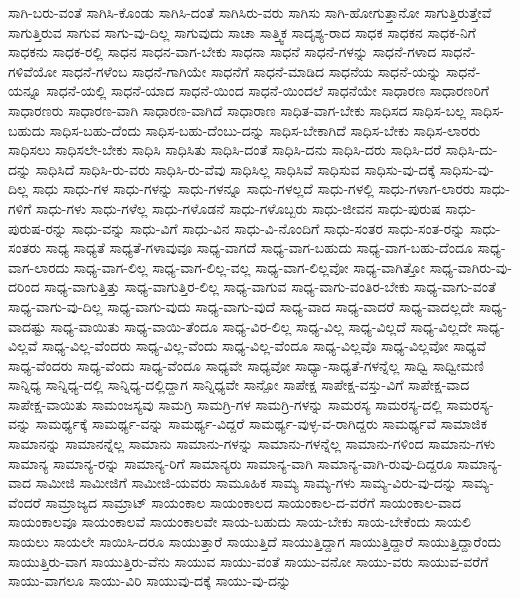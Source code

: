{ಸಾಗಿ-ಬರು-ವಂತೆ
ಸಾಗಿಸಿ-ಕೊಂಡು
ಸಾಗಿಸಿ-ದಂತೆ
ಸಾಗಿಸಿರು-ವರು
ಸಾಗಿಸು
ಸಾಗಿ-ಹೋಗುತ್ತಾನೋ
ಸಾಗುತ್ತಿರುತ್ತೇವೆ
ಸಾಗುತ್ತಿರುವ
ಸಾಗುವ
ಸಾಗು-ವು-ದಿಲ್ಲ
ಸಾಗುವುದು
ಸಾಚಾ
ಸಾತ್ತ್ವಿಕ
ಸಾದೃಶ್ಯ-ರಾದ
ಸಾಧಕ
ಸಾಧಕನ
ಸಾಧಕ-ನಿಗೆ
ಸಾಧಕನು
ಸಾಧಕ-ರಲ್ಲಿ
ಸಾಧನ
ಸಾಧನ-ವಾಗ-ಬೇಕು
ಸಾಧನಾ
ಸಾಧನೆ
ಸಾಧನೆ-ಗಳನ್ನು
ಸಾಧನೆ-ಗಳಾದ
ಸಾಧನೆ-ಗಳಿವೆಯೋ
ಸಾಧನೆ-ಗಳೆಂಬ
ಸಾಧನೆ-ಗಾಗಿಯೇ
ಸಾಧನೆಗೆ
ಸಾಧನೆ-ಮಾಡಿದ
ಸಾಧನೆಯ
ಸಾಧನೆ-ಯನ್ನು
ಸಾಧನೆ-ಯನ್ನೂ
ಸಾಧನೆ-ಯಲ್ಲಿ
ಸಾಧನೆ-ಯಾದ
ಸಾಧನೆ-ಯಿಂದ
ಸಾಧನೆ-ಯಿಂದಲೆ
ಸಾಧನೆಯೇ
ಸಾಧಾರಣ
ಸಾಧಾರಣರಿಗೆ
ಸಾಧಾರಣರು
ಸಾಧಾರಣ-ವಾಗಿ
ಸಾಧಾರಣ-ವಾಗಿದೆ
ಸಾಧಾರಾಣ
ಸಾಧಿತ-ವಾಗ-ಬೇಕು
ಸಾಧಿಸದ
ಸಾಧಿಸ-ಬಲ್ಲ
ಸಾಧಿಸ-ಬಹುದು
ಸಾಧಿಸ-ಬಹು-ದೆಂದು
ಸಾಧಿಸ-ಬಹು-ದೆಂಬು-ದನ್ನು
ಸಾಧಿಸ-ಬೇಕಾಗಿದೆ
ಸಾಧಿಸ-ಬೇಕು
ಸಾಧಿಸ-ಲಾರರು
ಸಾಧಿಸಲು
ಸಾಧಿಸಲೇ-ಬೇಕು
ಸಾಧಿಸಿ
ಸಾಧಿಸಿತು
ಸಾಧಿಸಿ-ದಂತೆ
ಸಾಧಿಸಿ-ದನು
ಸಾಧಿಸಿ-ದರು
ಸಾಧಿಸಿ-ದರೆ
ಸಾಧಿಸಿ-ದು-ದನ್ನು
ಸಾಧಿಸಿದೆ
ಸಾಧಿಸಿ-ರು-ವರು
ಸಾಧಿಸಿ-ರು-ವೆವು
ಸಾಧಿಸಿಲ್ಲ
ಸಾಧಿಸಿವೆ
ಸಾಧಿಸುವ
ಸಾಧಿಸು-ವು-ದಕ್ಕೆ
ಸಾಧಿಸು-ವು-ದಿಲ್ಲ
ಸಾಧು
ಸಾಧು-ಗಳ
ಸಾಧು-ಗಳನ್ನು
ಸಾಧು-ಗಳನ್ನೂ
ಸಾಧು-ಗಳಲ್ಲದೆ
ಸಾಧು-ಗಳಲ್ಲಿ
ಸಾಧು-ಗಳಾಗ-ಲಾರರು
ಸಾಧು-ಗಳಿಗೆ
ಸಾಧು-ಗಳು
ಸಾಧು-ಗಳೆಲ್ಲ
ಸಾಧು-ಗಳೊಡನೆ
ಸಾಧು-ಗಳೊಬ್ಬರು
ಸಾಧು-ಜೀವನ
ಸಾಧು-ಪುರುಷ
ಸಾಧು-ಪುರುಷ-ರನ್ನು
ಸಾಧು-ವನ್ನು
ಸಾಧು-ವಿಗೆ
ಸಾಧು-ವಿನ
ಸಾಧು-ವಿ-ನೊಂದಿಗೆ
ಸಾಧು-ಸಂತರ
ಸಾಧು-ಸಂತ-ರನ್ನು
ಸಾಧು-ಸಂತರು
ಸಾಧ್ಯ
ಸಾಧ್ಯತೆ
ಸಾಧ್ಯತೆ-ಗಳಾವುವೂ
ಸಾಧ್ಯ-ವಾಗದೆ
ಸಾಧ್ಯ-ವಾಗ-ಬಹುದು
ಸಾಧ್ಯ-ವಾಗ-ಬಹು-ದೆಂದೂ
ಸಾಧ್ಯ-ವಾಗ-ಲಾರದು
ಸಾಧ್ಯ-ವಾಗ-ಲಿಲ್ಲ
ಸಾಧ್ಯ-ವಾಗ-ಲಿಲ್ಲ-ವಲ್ಲ
ಸಾಧ್ಯ-ವಾಗ-ಲಿಲ್ಲವೋ
ಸಾಧ್ಯ-ವಾಗಿತ್ತೋ
ಸಾಧ್ಯ-ವಾಗಿರು-ವು-ದರಿಂದ
ಸಾಧ್ಯ-ವಾಗುತ್ತಿತ್ತು
ಸಾಧ್ಯ-ವಾಗುತ್ತಿರ-ಲಿಲ್ಲ
ಸಾಧ್ಯ-ವಾಗುವ
ಸಾಧ್ಯ-ವಾಗು-ವಂತಿರ-ಬೇಕು
ಸಾಧ್ಯ-ವಾಗು-ವಂತೆ
ಸಾಧ್ಯ-ವಾಗು-ವು-ದಿಲ್ಲ
ಸಾಧ್ಯ-ವಾಗು-ವುದು
ಸಾಧ್ಯ-ವಾಗು-ವುದೆ
ಸಾಧ್ಯ-ವಾದ
ಸಾಧ್ಯ-ವಾದರೆ
ಸಾಧ್ಯ-ವಾದಲ್ಲದೇ
ಸಾಧ್ಯ-ವಾದಷ್ಟು
ಸಾಧ್ಯ-ವಾಯಿತು
ಸಾಧ್ಯ-ವಾಯಿ-ತೆಂದೂ
ಸಾಧ್ಯ-ವಿರ-ಲಿಲ್ಲ
ಸಾಧ್ಯ-ವಿಲ್ಲ
ಸಾಧ್ಯ-ವಿಲ್ಲದೆ
ಸಾಧ್ಯ-ವಿಲ್ಲದೇ
ಸಾಧ್ಯ-ವಿಲ್ಲವೆ
ಸಾಧ್ಯ-ವಿಲ್ಲ-ವೆಂದರು
ಸಾಧ್ಯ-ವಿಲ್ಲ-ವೆಂದು
ಸಾಧ್ಯ-ವಿಲ್ಲ-ವೆಂದೂ
ಸಾಧ್ಯ-ವಿಲ್ಲವೊ
ಸಾಧ್ಯ-ವಿಲ್ಲವೋ
ಸಾಧ್ಯವೆ
ಸಾಧ್ಯ-ವೆಂದರು
ಸಾಧ್ಯ-ವೆಂದು
ಸಾಧ್ಯ-ವೆಂದೂ
ಸಾಧ್ಯವೇ
ಸಾಧ್ಯವೋ
ಸಾಧ್ಯಾ-ಸಾಧ್ಯತೆ-ಗಳನ್ನೆಲ್ಲ
ಸಾಧ್ವಿ
ಸಾಧ್ವೀಮಣಿ
ಸಾನ್ನಿಧ್ಯ
ಸಾನ್ನಿಧ್ಯ-ದಲ್ಲಿ
ಸಾನ್ನಿಧ್ಯ-ದಲ್ಲಿದ್ದಾಗ
ಸಾನ್ನಿಧ್ಯವೇ
ಸಾನ್ಪೋ
ಸಾಪೇಕ್ಷ
ಸಾಪೇಕ್ಷ-ವಸ್ತು-ವಿಗೆ
ಸಾಪೇಕ್ಷ-ವಾದ
ಸಾಪೇಕ್ಷ-ವಾಯಿತು
ಸಾಮಂಜಸ್ಯವು
ಸಾಮಗ್ರಿ
ಸಾಮಗ್ರಿ-ಗಳ
ಸಾಮಗ್ರಿ-ಗಳನ್ನು
ಸಾಮರಸ್ಯ
ಸಾಮರಸ್ಯ-ದಲ್ಲಿ
ಸಾಮರಸ್ಯ-ವನ್ನು
ಸಾಮರ್ಥ್ಯಕ್ಕೆ
ಸಾಮರ್ಥ್ಯ-ವನ್ನು
ಸಾಮರ್ಥ್ಯ-ವಿದ್ದರೆ
ಸಾಮರ್ಥ್ಯ-ವುಳ್ಳ-ವ-ರಾಗಿದ್ದರು
ಸಾಮರ್ಥ್ಯವೆ
ಸಾಮಾಜಿಕ
ಸಾಮಾನನ್ನು
ಸಾಮಾನನ್ನೆಲ್ಲ
ಸಾಮಾನು
ಸಾಮಾನು-ಗಳನ್ನು
ಸಾಮಾನು-ಗಳನ್ನೆಲ್ಲ
ಸಾಮಾನು-ಗಳಿಂದ
ಸಾಮಾನು-ಗಳು
ಸಾಮಾನ್ಯ
ಸಾಮಾನ್ಯ-ರನ್ನು
ಸಾಮಾನ್ಯ-ರಿಗೆ
ಸಾಮಾನ್ಯರು
ಸಾಮಾನ್ಯ-ವಾಗಿ
ಸಾಮಾನ್ಯ-ವಾಗಿ-ರುವು-ದಿದ್ದರೂ
ಸಾಮಾನ್ಯ-ವಾದ
ಸಾಮೀಜಿ
ಸಾಮೀಜಿಗೆ
ಸಾಮೀಜಿ-ಯವರು
ಸಾಮೂಹಿಕ
ಸಾಮ್ಯ
ಸಾಮ್ಯ-ಗಳು
ಸಾಮ್ಯ-ವಿರು-ವು-ದನ್ನು
ಸಾಮ್ಯ-ವೆಂದರೆ
ಸಾಮ್ರಾಜ್ಯದ
ಸಾಮ್ರಾಟ್
ಸಾಯಂಕಾಲ
ಸಾಯಂಕಾಲದ
ಸಾಯಂಕಾಲ-ದ-ವರೆಗೆ
ಸಾಯಂಕಾಲ-ವಾದ
ಸಾಯಂಕಾಲವೂ
ಸಾಯಂಕಾಲವೆ
ಸಾಯಂಕಾಲವೇ
ಸಾಯ-ಬಹುದು
ಸಾಯ-ಬೇಕು
ಸಾಯ-ಬೇಕೆಂದು
ಸಾಯಲಿ
ಸಾಯಲು
ಸಾಯಲೇ
ಸಾಯಿಸಿ-ದರೂ
ಸಾಯುತ್ತಾರೆ
ಸಾಯುತ್ತಿದೆ
ಸಾಯುತ್ತಿದ್ದಾಗ
ಸಾಯುತ್ತಿದ್ದಾರೆ
ಸಾಯುತ್ತಿದ್ದಾರೆಂದು
ಸಾಯುತ್ತಿರು-ವಾಗ
ಸಾಯುತ್ತಿರು-ವೆನು
ಸಾಯುವ
ಸಾಯು-ವಂತೆ
ಸಾಯು-ವನೋ
ಸಾಯು-ವರು
ಸಾಯುವ-ವರೆಗೆ
ಸಾಯು-ವಾಗಲೂ
ಸಾಯು-ವಿರಿ
ಸಾಯುವು-ದಕ್ಕೆ
ಸಾಯು-ವು-ದನ್ನು
}
